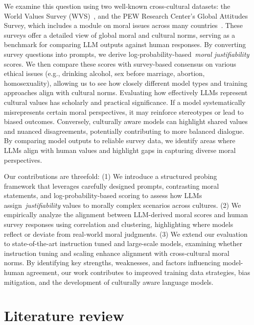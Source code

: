 \documentclass[runningheads]{llncs}
\begin{document}
We examine this question using two well-known cross-cultural datasets: the World Values Survey (WVS)~\cite{Inglehart2014,Haerpfer2022}, and the PEW Research Center's Global Attitudes Survey, which includes a module on moral issues across many countries~\cite{Pew2023}. These surveys offer a detailed view of global moral and cultural norms, serving as a benchmark for comparing LLM outputs against human responses. By converting survey questions into prompts, we derive log-probability-based~\emph{moral justifiability} scores. We then compare these scores with survey-based consensus on various ethical issues (e.g., drinking alcohol, sex before marriage, abortion, homosexuality), allowing us to see how closely different model types and training approaches align with cultural norms. Evaluating how effectively LLMs represent cultural values has scholarly and practical significance. If a model systematically misrepresents certain moral perspectives, it may reinforce stereotypes or lead to biased outcomes. Conversely, culturally aware models can highlight shared values and nuanced disagreements, potentially contributing to more balanced dialogue. By comparing model outputs to reliable survey data, we identify areas where LLMs align with human values and highlight gaps in capturing diverse moral perspectives.

Our contributions are threefold: (1) We introduce a structured probing framework that leverages carefully designed prompts, contrasting moral statements, and log-probability-based scoring to assess how LLMs assign~\emph{justifiability} values to morally complex scenarios across cultures. (2) We empirically analyze the alignment between LLM-derived moral scores and human survey responses using correlation and clustering, highlighting where models reflect or deviate from real-world moral judgments. (3) We extend our evaluation to state-of-the-art instruction tuned and large-scale models, examining whether instruction tuning and scaling enhance alignment with cross-cultural moral norms. By identifying key strengths, weaknesses, and factors influencing model-human agreement, our work contributes to improved training data strategies, bias mitigation, and the development of culturally aware language models.


\section{Literature review}
\end{document}
